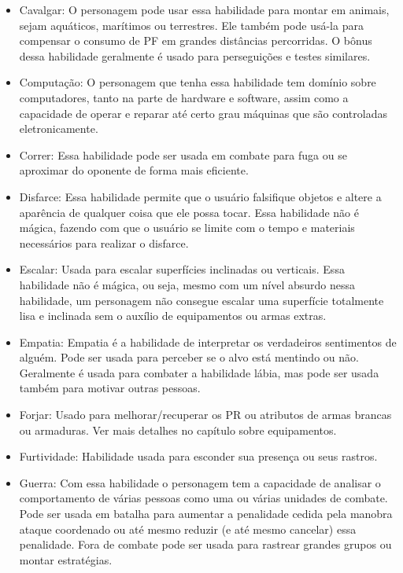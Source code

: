 \begin{itemize}
	\item Cavalgar: O personagem pode usar essa habilidade para montar em animais, sejam aquáticos, marítimos ou terrestres. Ele também pode usá-la para compensar o consumo de PF em grandes distâncias percorridas. O bônus dessa habilidade geralmente é usado para perseguições e testes similares.
	
	\item Computação: O personagem que tenha essa habilidade tem domínio sobre computadores, tanto na parte de hardware e software, assim como a capacidade de operar e reparar até certo grau máquinas que são controladas eletronicamente.  
	
	\item Correr: Essa habilidade pode ser usada em combate para fuga ou se aproximar do oponente de forma mais eficiente.
	
	\item Disfarce: Essa habilidade permite que o usuário falsifique objetos e altere a aparência de qualquer coisa que ele possa tocar. Essa habilidade não é mágica, fazendo com que o usuário se limite com o tempo e materiais necessários para realizar o disfarce.
	
	\item Escalar: Usada para escalar superfícies inclinadas ou verticais. Essa habilidade não é mágica, ou seja, mesmo com um nível absurdo nessa habilidade, um personagem não consegue escalar uma superfície totalmente lisa e inclinada sem o auxílio de equipamentos ou armas extras.
	
	\item Empatia: Empatia é a habilidade de interpretar os verdadeiros sentimentos de alguém. Pode ser usada para perceber se o alvo está mentindo ou não. Geralmente é usada para combater a habilidade lábia, mas pode ser usada também para motivar outras pessoas.
	
	\item Forjar: Usado para melhorar/recuperar os PR ou atributos de armas brancas ou armaduras. Ver mais detalhes no capítulo sobre equipamentos.
	
	\item Furtividade: Habilidade usada para esconder sua presença ou seus rastros.
		
	\item Guerra: Com essa habilidade o personagem tem a capacidade de analisar o comportamento de várias pessoas como uma ou várias unidades de combate. Pode ser usada em batalha para aumentar a penalidade cedida pela manobra ataque coordenado ou até mesmo reduzir (e até mesmo cancelar) essa penalidade. Fora de combate pode ser usada para rastrear grandes grupos ou montar estratégias.


\end{itemize}
